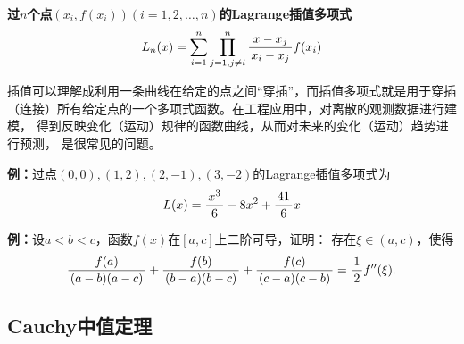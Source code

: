 \begin{shaded}
	\begin{tcolorbox}
		{\bf 过$n$个点$(x_i,f(x_i))(i=1,2,\ldots,n)$的Lagrange插值多项式}
		$$L_n(x)=\sum\limits_{i=1}^n\prod_{j=1,j\ne i}^{n}
		\displaystyle\frac{\,{x-x_j}\,}{\,{x_i-x_j}\,}f(x_i)$$
	\end{tcolorbox}
	
	插值可以理解成利用一条曲线在给定的点之间“穿插”，而插值多项式就是用于穿插
	（连接）所有给定点的一个多项式函数。在工程应用中，对离散的观测数据进行建模，
	得到反映变化（运动）规律的函数曲线，从而对未来的变化（运动）趋势进行预测，
	是很常见的问题。
	
	{\bf 例：}过点$(0,0),(1,2),(2,-1),(3,-2)$的Lagrange插值多项式为
	$$L(x)=\displaystyle\frac{\,{x^3}\,}{\,{6}\,}-8x^2+\displaystyle\frac{\,{41}\,}{\,{6}\,}x$$
	
	\begin{center}
	\end{center}
	
	{\bf 例：}设$a<b<c$，函数$f(x)$在$[a,c]$上二阶可导，证明：
	存在$\xi\in(a,c)$，使得
	$$
	\displaystyle\frac{\,{f(a)}\,}{\,{(a-b)(a-c)}\,}+\displaystyle\frac{\,{f(b)}\,}{\,{(b-a)(b-c)}\,}
	+\displaystyle\frac{\,{f(c)}\,}{\,{(c-a)(c-b)}\,}=\displaystyle\frac{\,{1}\,}{\,{2}\,}f''(\xi).
	$$
\end{shaded}

% 

\subsection{Cauchy中值定理}

